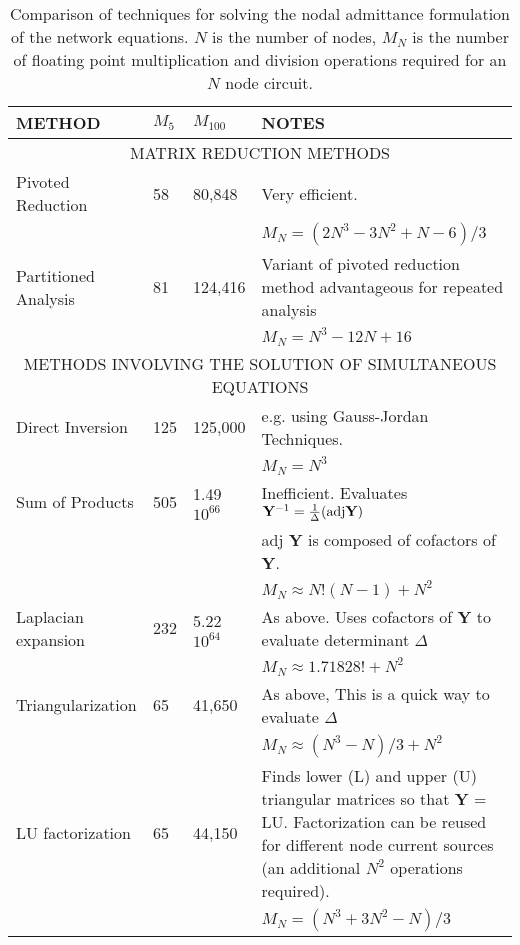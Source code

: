 \begin{table}
\leavevmode
   \caption{\label{nodal:table:compare}Comparison of techniques for
solving the nodal admittance formulation of the network
equations. $N$ is the number of nodes, $M_N$ is the number
of floating point multiplication and division operations
required for an $N$ node circuit.}\vspace*{0.1in}
\centering
\begin{tabular}{|lllp{3in}|}
\hline
METHOD  &  $M_5$ & $M_{100}$ & NOTES \\
\hline
\hline
\multicolumn{4}{|c|}{MATRIX REDUCTION METHODS}\\
\hline
Pivoted Reduction &  58 & 80,848&
  Very efficient. \\
  &&& $M_N =  (2N^3 - 3N^2 + N - 6)/3$\\
  \hline
Partitioned Analysis &  81  &124,416&
  Variant of pivoted reduction method advantageous for repeated analysis\\
  &&& $M_N =  N^3 - 12N + 16$\\
  \hline
  \hline
\multicolumn{4}{|c|}{METHODS INVOLVING THE SOLUTION OF SIMULTANEOUS EQUATIONS}\\
\hline
Direct Inversion    & 125 & 125,000 & e.g. using Gauss-Jordan Techniques.\\
  &&& $M_N =  N^3$\\
  \hline
Sum of Products     &  505 & 1.49 $10^{66}$&
  Inefficient.
  Evaluates ${\bf Y}^{-1} = {1 \over \Delta} (\mbox{adj} {\bf Y})$\\
                    &   &&
  \mbox{adj} {\bf Y} is composed of cofactors of {\bf Y}. \\
  &&& $M_N \approx N!(N-1) + N^2$\\
  \hline
Laplacian expansion & 232   & 5.22 $10^{64}$&
  As above. Uses cofactors of {\bf Y} to evaluate determinant $\Delta$\\
  &&& $M_N \approx 1.71828! + N^2$\\
  \hline
Triangularization   & 65    & 41,650&
  As above, This is a quick way to evaluate $\Delta$\\
  &&& $M_N \approx (N^3 - N)/3 + N^2$\\
  \hline
LU factorization    & 65    & 44,150&
  Finds lower (L) and upper (U) triangular matrices so that {\bf Y} = LU.
  Factorization can be reused for different node current sources (an additional
  $N^2$ operations required). \\
  &&& $M_N = (N^3+3N^2-N)/3$\\

\end{tabular}
\end{table}
